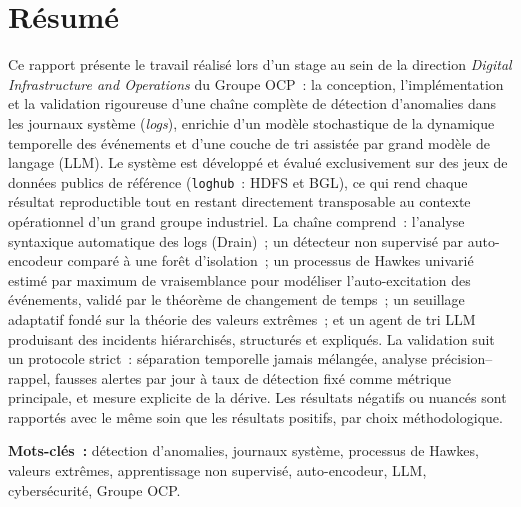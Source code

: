 \documentclass[11pt,a4paper]{report}
\newcommand{\code}[1]{\texttt{\small #1}}
\begin{document}
\chapter*{R\'esum\'e}
Ce rapport pr\'esente le travail r\'ealis\'e lors d'un stage au sein de la
direction \emph{Digital Infrastructure and Operations} du Groupe OCP~: la
conception, l'impl\'ementation et la validation rigoureuse d'une cha\^ine
compl\`ete de d\'etection d'anomalies dans les journaux syst\`eme
(\emph{logs}), enrichie d'un mod\`ele stochastique de la dynamique temporelle
des \'ev\'enements et d'une couche de tri assist\'ee par grand mod\`ele de
langage (LLM). Le syst\`eme est d\'evelopp\'e et \'evalu\'e exclusivement sur
des jeux de donn\'ees publics de r\'ef\'erence (\code{loghub}~: HDFS et BGL),
ce qui rend chaque r\'esultat reproductible tout en restant directement
transposable au contexte op\'erationnel d'un grand groupe industriel. La
cha\^ine comprend~: l'analyse syntaxique automatique des logs (Drain)~; un
d\'etecteur non supervis\'e par auto-encodeur compar\'e \`a une for\^et
d'isolation~; un processus de Hawkes univari\'e estim\'e par maximum de
vraisemblance pour mod\'eliser l'auto-excitation des \'ev\'enements,
valid\'e par le th\'eor\`eme de changement de temps~; un seuillage adaptatif
fond\'e sur la th\'eorie des valeurs extr\^emes~; et un agent de tri LLM
produisant des incidents hi\'erarchis\'es, structur\'es et expliqu\'es. La
validation suit un protocole strict~: s\'eparation temporelle jamais
m\'elang\'ee, analyse pr\'ecision--rappel, fausses alertes par jour \`a taux
de d\'etection fix\'e comme m\'etrique principale, et mesure explicite de la
d\'erive. Les r\'esultats n\'egatifs ou nuanc\'es sont rapport\'es avec le
m\^eme soin que les r\'esultats positifs, par choix m\'ethodologique.

\vspace{0.4em}
\noindent\textbf{Mots-cl\'es~:} d\'etection d'anomalies, journaux syst\`eme,
processus de Hawkes, valeurs extr\^emes, apprentissage non supervis\'e,
auto-encodeur, LLM, cybers\'ecurit\'e, Groupe OCP.

\tableofcontents
\listoffigures
\listoftables
\end{document}
